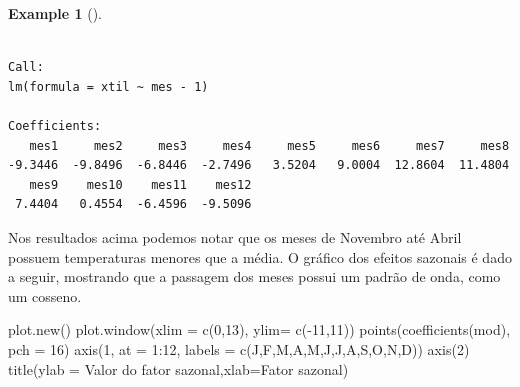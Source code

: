 \documentclass[
  letterpaper,
  DIV=11,
  numbers=noendperiod]{scrartcl}
\newenvironment{Shaded}{\begin{snugshade}}{\end{snugshade}}
\newcommand{\AttributeTok}[1]{\textcolor[rgb]{0.40,0.45,0.13}{#1}}
\newcommand{\DecValTok}[1]{\textcolor[rgb]{0.68,0.00,0.00}{#1}}
\newcommand{\FunctionTok}[1]{\textcolor[rgb]{0.28,0.35,0.67}{#1}}
\newcommand{\NormalTok}[1]{\textcolor[rgb]{0.00,0.23,0.31}{#1}}
\newcommand{\SpecialCharTok}[1]{\textcolor[rgb]{0.37,0.37,0.37}{#1}}
\newcommand{\StringTok}[1]{\textcolor[rgb]{0.13,0.47,0.30}{#1}}
\theoremstyle{definition}
\newtheorem{example}{Example}[chapter]
\theoremstyle{definition}
\theoremstyle{plain}
\theoremstyle{plain}
\theoremstyle{remark}
\begin{document}
\begin{example}[]
\begin{verbatim}

Call:
lm(formula = xtil ~ mes - 1)

Coefficients:
   mes1     mes2     mes3     mes4     mes5     mes6     mes7     mes8  
-9.3446  -9.8496  -6.8446  -2.7496   3.5204   9.0004  12.8604  11.4804  
   mes9    mes10    mes11    mes12  
 7.4404   0.4554  -6.4596  -9.5096  
\end{verbatim}

Nos resultados acima podemos notar que os meses de Novembro até Abril
possuem temperaturas menores que a média. O gráfico dos efeitos sazonais
é dado a seguir, mostrando que a passagem dos meses possui um padrão de
onda, como um cosseno.

\begin{Shaded}
\begin{Highlighting}[]
\FunctionTok{plot.new}\NormalTok{()}
\FunctionTok{plot.window}\NormalTok{(}\AttributeTok{xlim =} \FunctionTok{c}\NormalTok{(}\DecValTok{0}\NormalTok{,}\DecValTok{13}\NormalTok{), }\AttributeTok{ylim=} \FunctionTok{c}\NormalTok{(}\SpecialCharTok{{-}}\DecValTok{11}\NormalTok{,}\DecValTok{11}\NormalTok{))}
\FunctionTok{points}\NormalTok{(}\FunctionTok{coefficients}\NormalTok{(mod), }\AttributeTok{pch =} \DecValTok{16}\NormalTok{)}
\FunctionTok{axis}\NormalTok{(}\DecValTok{1}\NormalTok{, }\AttributeTok{at =} \DecValTok{1}\SpecialCharTok{:}\DecValTok{12}\NormalTok{, }\AttributeTok{labels =} \FunctionTok{c}\NormalTok{(}\StringTok{\textquotesingle{}J\textquotesingle{}}\NormalTok{,}\StringTok{\textquotesingle{}F\textquotesingle{}}\NormalTok{,}\StringTok{\textquotesingle{}M\textquotesingle{}}\NormalTok{,}\StringTok{\textquotesingle{}A\textquotesingle{}}\NormalTok{,}\StringTok{\textquotesingle{}M\textquotesingle{}}\NormalTok{,}\StringTok{\textquotesingle{}J\textquotesingle{}}\NormalTok{,}\StringTok{\textquotesingle{}J\textquotesingle{}}\NormalTok{,}\StringTok{\textquotesingle{}A\textquotesingle{}}\NormalTok{,}\StringTok{\textquotesingle{}S\textquotesingle{}}\NormalTok{,}\StringTok{\textquotesingle{}O\textquotesingle{}}\NormalTok{,}\StringTok{\textquotesingle{}N\textquotesingle{}}\NormalTok{,}\StringTok{\textquotesingle{}D\textquotesingle{}}\NormalTok{))}
\FunctionTok{axis}\NormalTok{(}\DecValTok{2}\NormalTok{)}
\FunctionTok{title}\NormalTok{(}\AttributeTok{ylab =} \StringTok{\textquotesingle{}Valor do fator sazonal\textquotesingle{}}\NormalTok{,}\AttributeTok{xlab=}\StringTok{\textquotesingle{}Fator sazonal\textquotesingle{}}\NormalTok{)}
\end{Highlighting}
\end{Shaded}


\end{example}
\end{document}
